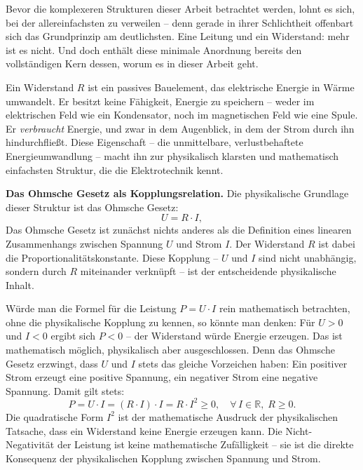 ﻿\documentclass[12pt, a4paper]{article}
\begin{document}
	Bevor die komplexeren Strukturen dieser Arbeit betrachtet werden, lohnt es sich, bei der allereinfachsten zu verweilen -- denn gerade in ihrer Schlichtheit offenbart sich das Grundprinzip am deutlichsten. Eine Leitung und ein Widerstand: mehr ist es nicht. Und doch enthält diese minimale Anordnung bereits den vollständigen Kern dessen, worum es in dieser Arbeit geht.

	Ein Widerstand $R$ ist ein passives Bauelement, das elektrische Energie in Wärme umwandelt. Er besitzt keine Fähigkeit, Energie zu speichern -- weder im elektrischen Feld wie ein Kondensator, noch im magnetischen Feld wie eine Spule. Er \textit{verbraucht} Energie, und zwar in dem Augenblick, in dem der Strom durch ihn hindurchfließt. Diese Eigenschaft -- die unmittelbare, verlustbehaftete Energieumwandlung -- macht ihn zur physikalisch klarsten und mathematisch einfachsten Struktur, die die Elektrotechnik kennt.

	\textbf{Das Ohmsche Gesetz als Kopplungsrelation.}
	Die physikalische Grundlage dieser Struktur ist das Ohmsche Gesetz:
	\begin{equation}
		U = R \cdot I,
		\label{eq:ohm}
	\end{equation}
	Das Ohmsche Gesetz ist zunächst nichts anderes als die Definition eines linearen Zusammenhangs zwischen Spannung $U$ und Strom $I$. Der Widerstand $R$ ist dabei die Proportionalitätskonstante. Diese Kopplung -- $U$ und $I$ sind nicht unabhängig, sondern durch $R$ miteinander verknüpft -- ist der entscheidende physikalische Inhalt.

	Würde man die Formel für die Leistung $P = U \cdot I$ rein mathematisch betrachten, ohne die physikalische Kopplung zu kennen, so könnte man denken: Für $U > 0$ und $I < 0$ ergibt sich $P < 0$ -- der Widerstand würde Energie erzeugen. Das ist mathematisch möglich, physikalisch aber ausgeschlossen. Denn das Ohmsche Gesetz erzwingt, dass $U$ und $I$ stets das gleiche Vorzeichen haben: Ein positiver Strom erzeugt eine positive Spannung, ein negativer Strom eine negative Spannung. Damit gilt stets:
	\begin{equation}
		P = U \cdot I = (R \cdot I) \cdot I = R \cdot I^2 \geq 0, \quad \forall\, I \in \mathbb{R},\; R \geq 0.
		\label{eq:leistung_widerstand_einl}
	\end{equation}
	Die quadratische Form $I^2$ ist der mathematische Ausdruck der physikalischen Tatsache, dass ein Widerstand keine Energie erzeugen kann. Die Nicht-Negativität der Leistung ist keine mathematische Zufälligkeit -- sie ist die direkte Konsequenz der physikalischen Kopplung zwischen Spannung und Strom.
\end{document}
